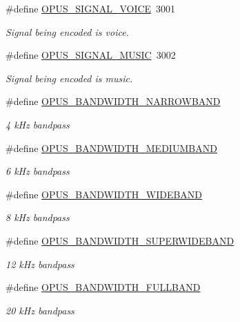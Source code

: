 \begin{DoxyCompactItemize}
\#define \hyperlink{group__opus__ctlvalues_ga085a116fed816373d3b9eae28df49404}{O\+P\+U\+S\+\_\+\+S\+I\+G\+N\+A\+L\+\_\+\+V\+O\+I\+CE}~3001
\begin{DoxyCompactList}\small\item\em Signal being encoded is voice. \end{DoxyCompactList}\item 
\#define \hyperlink{group__opus__ctlvalues_gaa0c228c664b6d426f4c213e3a5350889}{O\+P\+U\+S\+\_\+\+S\+I\+G\+N\+A\+L\+\_\+\+M\+U\+S\+IC}~3002
\begin{DoxyCompactList}\small\item\em Signal being encoded is music. \end{DoxyCompactList}\item 
\#define \hyperlink{group__opus__ctlvalues_ga607dd310958b9c7d545d005e4572d47f}{O\+P\+U\+S\+\_\+\+B\+A\+N\+D\+W\+I\+D\+T\+H\+\_\+\+N\+A\+R\+R\+O\+W\+B\+A\+ND}
\begin{DoxyCompactList}\small\item\em 4 k\+Hz bandpass \end{DoxyCompactList}\item 
\#define \hyperlink{group__opus__ctlvalues_ga53a2aff4dc0ee23682927ca568c422a3}{O\+P\+U\+S\+\_\+\+B\+A\+N\+D\+W\+I\+D\+T\+H\+\_\+\+M\+E\+D\+I\+U\+M\+B\+A\+ND}
\begin{DoxyCompactList}\small\item\em 6 k\+Hz bandpass \end{DoxyCompactList}\item 
\#define \hyperlink{group__opus__ctlvalues_gac698e5d1281a3632251d2a4ead48afb9}{O\+P\+U\+S\+\_\+\+B\+A\+N\+D\+W\+I\+D\+T\+H\+\_\+\+W\+I\+D\+E\+B\+A\+ND}
\begin{DoxyCompactList}\small\item\em 8 k\+Hz bandpass \end{DoxyCompactList}\item 
\#define \hyperlink{group__opus__ctlvalues_ga41f86df35af0033a7361895da88671c1}{O\+P\+U\+S\+\_\+\+B\+A\+N\+D\+W\+I\+D\+T\+H\+\_\+\+S\+U\+P\+E\+R\+W\+I\+D\+E\+B\+A\+ND}
\begin{DoxyCompactList}\small\item\em 12 k\+Hz bandpass \end{DoxyCompactList}\item 
\#define \hyperlink{group__opus__ctlvalues_ga74cb052d8ec36cbcc9708c417558ebdd}{O\+P\+U\+S\+\_\+\+B\+A\+N\+D\+W\+I\+D\+T\+H\+\_\+\+F\+U\+L\+L\+B\+A\+ND}
\begin{DoxyCompactList}\small\item\em 20 k\+Hz bandpass \end{DoxyCompactList}\item 

\end{DoxyCompactItemize}
